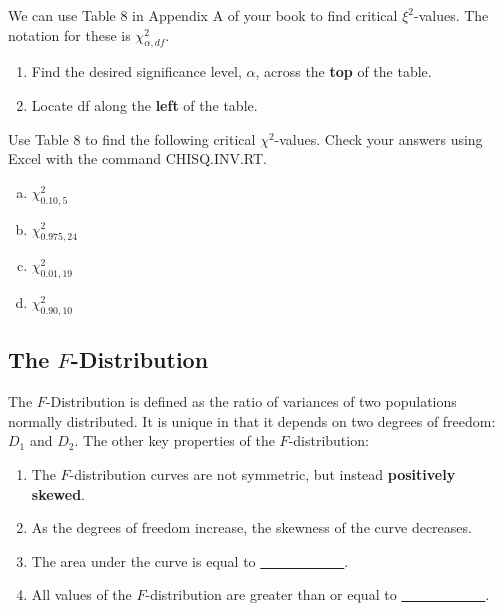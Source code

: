 \documentclass[12pt, letterpaper]{article}
\newcommand{\ds}{\displaystyle}
\newcounter{exercise}
\theoremstyle{definition}
\begin{document}
\noindent We can use Table 8 in Appendix A of your book to find critical $\xi^2$-values. The notation for these is $\chi_{\alpha,df}^2$.

\begin{enumerate}
\item Find the desired significance level, $\alpha$, across the \textbf{top} of the table.
\item Locate df along the \textbf{left} of the table.
\end{enumerate}


\begin{exercise}  

Use Table 8 to find the following critical $\chi^2$-values.  Check your answers using Excel with the command CHISQ.INV.RT.

\end{exercise}

\begin{enumerate}[(a)]

\item $\ds\chi_{0.10,5}^2$

\vfill

\item $\ds\chi_{0.975,24}^2$

\vfill

\item $\ds\chi_{0.01,19}^2$

\vfill

\item $\ds\chi_{0.90,10}^2$

\vfill

\end{enumerate}

\newpage

\begin{statement}
\section*{The $F$-Distribution}

The $F$-Distribution is defined as the ratio of variances of two populations normally distributed.  It is unique in that it depends on two degrees of freedom:  $D_1$ and $D_2$.  The other key properties of the $F$-distribution:

\begin{enumerate}

\item The $F$-distribution curves are not symmetric, but instead \textbf{positively skewed}.

\item As the degrees of freedom increase, the skewness of the curve decreases.

\item The area under the curve is equal to \underline{~~~~~~~~~~~~}.

\item All values of the $F$-distribution are greater than or equal to \underline{~~~~~~~~~~~~}.

\end{enumerate}

\end{statement}
\end{document}
